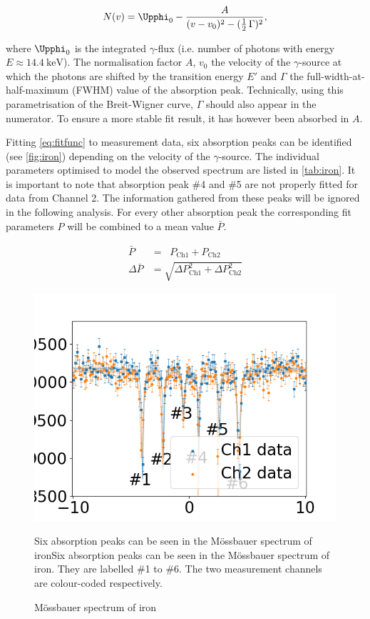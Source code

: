\begin{equation}
\label{eq:fitfunc}
N(v) = \Upphi_0 - \frac{A}{(v-v_0)^2 - (\frac{1}{2}\,\Gamma)^2},
\end{equation}

where $\Upphi_0$ is the integrated $\gamma$-flux (i.e. number of photons with energy 
$E\approx\SI{14.4}{\kilo\electronvolt}$). The normalisation factor $A$, $v_0$ the 
velocity of the $\gamma$-source at which the photons are shifted by the transition 
energy $E'$ and $\Gamma$ the full-width-at-half-maximum (FWHM) value of the 
absorption peak. Technically, using this parametrisation of the Breit-Wigner curve, 
$\Gamma$ should also appear in the numerator. To ensure a more stable fit result, 
it has however been absorbed in $A$.

Fitting \autoref{eq:fitfunc} to measurement data, six absorption peaks can be 
identified (see \autoref{fig:iron}) depending on the velocity of the $\gamma$-source.
The individual parameters optimised to model the observed spectrum are listed in 
\autoref{tab:iron}. It is important to note that absorption peak \#4 and \#5 are not 
properly fitted for data from Channel 2. The information gathered from these peaks
will be ignored in the following analysis. For every other absorption peak the
corresponding fit parameters $P$ will be combined to a mean value $\bar{P}$.

\begin{align*}
	\bar{P} &= \;\;P_\text{Ch1} + P_\text{Ch2} \\[0.5cm]
	\Delta\bar{P} &= \sqrt{\Delta P_\text{Ch1}^2 + \Delta P_\text{Ch2}^2  } 
\end{align*}

\begin{figure}
	\label{fig:iron}
	\includegraphics[width=1.0\textwidth]{./fig/Iron.png}
	\caption{Mössbauer spectrum of iron}{Six absorption peaks can be seen in the
	Mössbauer spectrum of ironSix absorption peaks can be seen in the
	Mössbauer spectrum of iron. They are labelled \#1 to \#6. The two measurement
	channels are colour-coded respectively.}
\end{figure}



